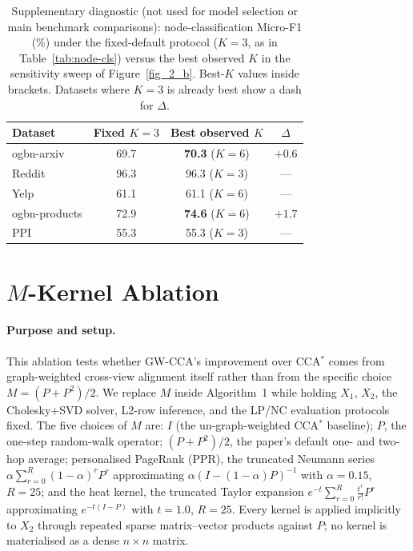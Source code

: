 \documentclass{article}
\begin{document}
\begin{table}[h]
\centering
\small
\caption{Supplementary diagnostic (not used for model selection or main
benchmark comparisons): node-classification Micro-F1 (\%) under the
fixed-default protocol ($K = 3$, as in Table~\ref{tab:node-cls}) versus
the best observed $K$ in the sensitivity sweep of Figure~\ref{fig_2_b}.
Best-$K$ values inside brackets. Datasets where $K = 3$ is already best
show a dash for $\Delta$.}
\label{tab:best-k}
\begin{tabular}{l cc c}
\toprule
Dataset & Fixed $K = 3$ & Best observed $K$ & $\Delta$ \\
\midrule
ogbn-arxiv    & 69.7 & \textbf{70.3} ($K = 6$) & $+0.6$ \\
Reddit        & 96.3 & 96.3 ($K = 3$)         & ---     \\
Yelp          & 61.1 & 61.1 ($K = 6$)         & ---     \\
ogbn-products & 72.9 & \textbf{74.6} ($K = 6$) & $+1.7$ \\
PPI           & 55.3 & 55.3 ($K = 3$)         & ---     \\
\bottomrule
\end{tabular}
\end{table}

\section{$M$-Kernel Ablation}
\label{app:m-ablation}
\paragraph{Purpose and setup.} This ablation tests whether GW-CCA's
improvement over CCA$^\ast$ comes from graph-weighted cross-view
alignment itself rather than from the specific choice
$M = (P + P^{2})/2$. We replace $M$ inside Algorithm~1 while holding
$X_1$, $X_2$, the Cholesky+SVD solver, L2-row inference, and the
LP/NC evaluation protocols fixed. The five choices of $M$ are: $I$
(the un-graph-weighted CCA$^\ast$ baseline); $P$, the one-step
random-walk operator; $(P + P^{2})/2$, the paper's default one- and
two-hop average; personalised PageRank (PPR), the truncated Neumann
series $\alpha \sum_{r=0}^{R}(1-\alpha)^{r} P^{r}$ approximating
$\alpha(I - (1-\alpha)P)^{-1}$ with $\alpha = 0.15$, $R = 25$; and
the heat kernel, the truncated Taylor expansion
$e^{-t}\sum_{r=0}^{R} \tfrac{t^{r}}{r!} P^{r}$ approximating
$e^{-t(I - P)}$ with $t = 1.0$, $R = 25$. Every kernel is applied
implicitly to $X_2$ through repeated sparse matrix--vector products
against $P$; no kernel is materialised as a dense $n \times n$ matrix.
\end{document}
